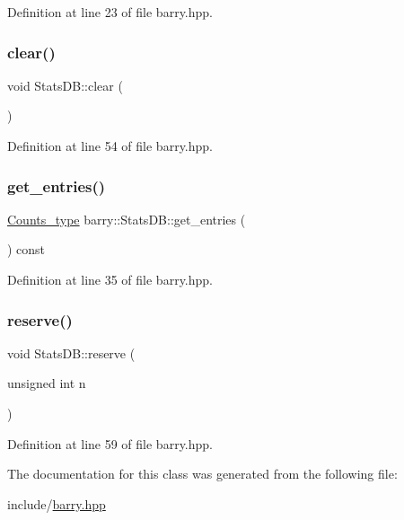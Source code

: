 Definition at line 23 of file barry.\+hpp.

\mbox{\label{classbarry_1_1_stats_d_b_a5de68def55b0a3b99a8f609815624a00}} 
\subsubsection{\texorpdfstring{clear()}{clear()}}
{\footnotesize\ttfamily void Stats\+D\+B\+::clear (\begin{DoxyParamCaption}{ }\end{DoxyParamCaption})\hspace{0.3cm}{\ttfamily [inline]}}



Definition at line 54 of file barry.\+hpp.

\mbox{\label{classbarry_1_1_stats_d_b_a396e0921c34a854320a8027ce0f29278}} 
\subsubsection{\texorpdfstring{get\+\_\+entries()}{get\_entries()}}
{\footnotesize\ttfamily \hyperlink{namespacebarry_a3e2d8c3b6cf602107559d4237d9f1315}{Counts\+\_\+type} barry\+::\+Stats\+D\+B\+::get\+\_\+entries (\begin{DoxyParamCaption}{ }\end{DoxyParamCaption}) const\hspace{0.3cm}{\ttfamily [inline]}}



Definition at line 35 of file barry.\+hpp.

\mbox{\label{classbarry_1_1_stats_d_b_a3370b7f2fb16aa047f8a938232a98602}} 
\subsubsection{\texorpdfstring{reserve()}{reserve()}}
{\footnotesize\ttfamily void Stats\+D\+B\+::reserve (\begin{DoxyParamCaption}\item[{unsigned int}]{n }\end{DoxyParamCaption})\hspace{0.3cm}{\ttfamily [inline]}}



Definition at line 59 of file barry.\+hpp.



The documentation for this class was generated from the following file\+:\begin{DoxyCompactItemize}
\item 
include/\hyperlink{barry_8hpp}{barry.\+hpp}\end{DoxyCompactItemize}

